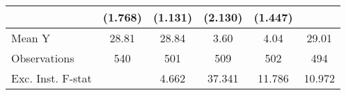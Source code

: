 {\begin{tabular}{l*{5}{c}}
            &     (1.768)         &     (1.131)         &     (2.130)         &     (1.447)         &                     \\
\midrule
Mean Y      &       28.81         &       28.84         &        3.60         &        4.04         &       29.01         \\
Observations&         540         &         501         &         509         &         502         &         494         \\
Exc. Inst. F-stat&                     &       4.662         &      37.341         &      11.786         &      10.972         \\
\bottomrule
\end{tabular}
}
